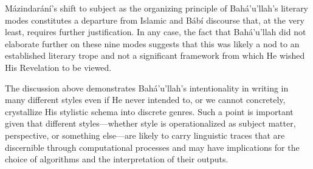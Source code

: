 \documentclass[12pt, oneside]{report}
\begin{document}
M\'{a}zindar\'{a}n\'{i}'s shift to subject as the organizing principle of Bah\'{a}'u'llah's literary modes constitutes a departure from Islamic and B\'{a}b\'{i} discourse that, at the very least, requires further justification.
In any case, the fact that Bah\'{a}'u'llah did not elaborate further on these nine modes suggests that this was likely a nod to an established literary trope and not a significant framework from which He wished His Revelation to be viewed.
\par
The discussion above demonstrates Bah\'{a}'u'llah's intentionality in writing in many different styles even if He never intended to, or we cannot concretely, crystallize His stylistic schema into discrete genres.
Such a point is important given that different styles---whether style is operationalized as subject matter, perspective, or something else---are likely to carry linguistic traces that are discernible through computational processes and may have implications for the choice of algorithms and the interpretation of their outputs.
\end{document}
